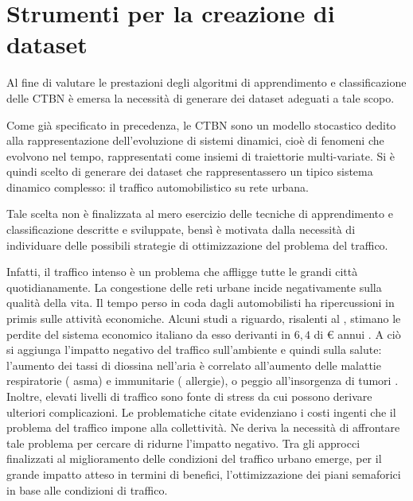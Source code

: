 
\chapter{Strumenti per la creazione di dataset}
\label{cap:tsis-sensors}
Al fine di valutare le prestazioni degli algoritmi di apprendimento e classificazione delle \acl{CTBN} è emersa la necessità di generare dei dataset adeguati a tale scopo.

Come già specificato in precedenza, le \acs{CTBN} sono un modello stocastico dedito alla rappresentazione dell'evoluzione di sistemi dinamici, cioè di fenomeni che evolvono nel tempo, rappresentati come insiemi di traiettorie multi-variate. Si è quindi scelto di generare dei dataset che rappresentassero un tipico sistema dinamico complesso: il traffico automobilistico su rete urbana.

Tale scelta non è finalizzata al mero esercizio delle tecniche di apprendimento e classificazione descritte e sviluppate, bensì è motivata dalla necessità di individuare delle possibili strategie di ottimizzazione del problema del traffico.

Infatti, il traffico intenso è un problema che affligge tutte le grandi città quotidianamente. La congestione delle reti urbane incide negativamente sulla qualità della vita. Il tempo perso in coda dagli automobilisti ha ripercussioni in primis sulle attività economiche. Alcuni studi a riguardo, risalenti al \citeyear{Certet2004}, stimano le perdite del sistema economico italiano da esso derivanti in $6,4$  di \euro{} annui \citep{Certet2004}. A ciò si aggiunga l'impatto negativo del traffico sull'ambiente e quindi sulla salute: l'aumento dei tassi di diossina nell'aria è correlato all'aumento delle malattie respiratorie (\eg{} asma) e immunitarie (\eg{} allergie), o peggio all'insorgenza di tumori \citep{Gualtieri2005,Mantecca2007}. Inoltre, elevati livelli di traffico sono fonte di stress da cui possono derivare ulteriori complicazioni. Le problematiche citate evidenziano i costi ingenti che il problema del traffico impone alla collettività. Ne deriva la necessità di affrontare tale problema per cercare di ridurne l'impatto negativo. Tra gli approcci \citep[elencati esaustivamente in][]{Papageorgiou2005} finalizzati al miglioramento delle condizioni del traffico urbano emerge, per il grande impatto atteso in termini di benefici, l'ottimizzazione dei piani semaforici in base alle condizioni di traffico.

